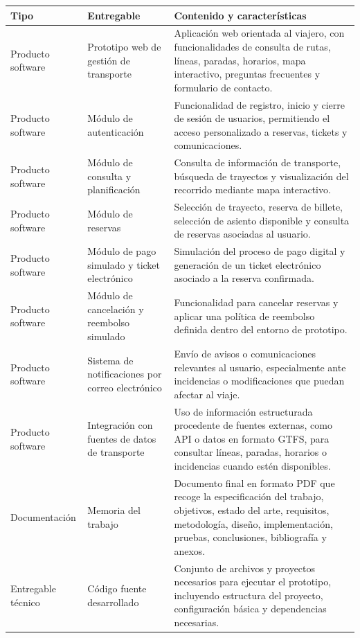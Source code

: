 \begin{table}[h!]
\centering
\small
\begin{tabular}{|p{2.4cm}|p{3.8cm}|p{7.2cm}|}
\hline
\textbf{Tipo} & \textbf{Entregable} & \textbf{Contenido y características} \\ \hline
Producto software & Prototipo web de gestión de transporte & Aplicación web orientada al viajero, con funcionalidades de consulta de rutas, líneas, paradas, horarios, mapa interactivo, preguntas frecuentes y formulario de contacto. \\ \hline
Producto software & Módulo de autenticación & Funcionalidad de registro, inicio y cierre de sesión de usuarios, permitiendo el acceso personalizado a reservas, tickets y comunicaciones. \\ \hline
Producto software & Módulo de consulta y planificación & Consulta de información de transporte, búsqueda de trayectos y visualización del recorrido mediante mapa interactivo. \\ \hline
Producto software & Módulo de reservas & Selección de trayecto, reserva de billete, selección de asiento disponible y consulta de reservas asociadas al usuario. \\ \hline
Producto software & Módulo de pago simulado y ticket electrónico & Simulación del proceso de pago digital y generación de un ticket electrónico asociado a la reserva confirmada. \\ \hline
Producto software & Módulo de cancelación y reembolso simulado & Funcionalidad para cancelar reservas y aplicar una política de reembolso definida dentro del entorno de prototipo. \\ \hline
Producto software & Sistema de notificaciones por correo electrónico & Envío de avisos o comunicaciones relevantes al usuario, especialmente ante incidencias o modificaciones que puedan afectar al viaje. \\ \hline
Producto software & Integración con fuentes de datos de transporte & Uso de información estructurada procedente de fuentes externas, como API o datos en formato GTFS, para consultar líneas, paradas, horarios o incidencias cuando estén disponibles. \\ \hline
Documentación & Memoria del trabajo & Documento final en formato PDF que recoge la especificación del trabajo, objetivos, estado del arte, requisitos, metodología, diseño, implementación, pruebas, conclusiones, bibliografía y anexos. \\ \hline
Entregable técnico & Código fuente desarrollado & Conjunto de archivos y proyectos necesarios para ejecutar el prototipo, incluyendo estructura del proyecto, configuración básica y dependencias necesarias. \\ \hline

\end{tabular}
\end{table}
